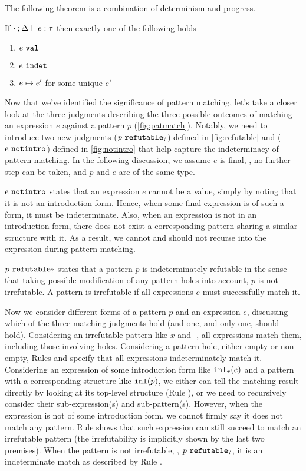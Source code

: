 The following theorem is a combination of determinism and progress.
\begin{theorem}
  \label{theorem:determinism}
  If $\cdot \mathbin{;} \Delta \vdash e : \tau$ then exactly one of the following holds
  \begin{enumerate}
    \item $e ~\mathtt{val}$
    \item $e ~\mathtt{indet}$
    \item $e \mapsto e'$ for some unique $e'$
  \end{enumerate}
\end{theorem}




Now that we've identified the significance of pattern matching, let's take a closer look at the three judgments describing the three possible outcomes of matching an expression $e$ against a pattern $p$ (\autoref{fig:patmatch}). Notably, we need to introduce two new judgments ($p ~\mathtt{refutable}_?$) defined in \autoref{fig:refutable} and ($e ~\mathtt{notintro}$) defined in \autoref{fig:notintro} that help capture the indeterminacy of pattern matching. In the following discussion, we assume $e$ is final, \ie, no further step can be taken, and $p$ and $e$ are of the same type.

$e ~\mathtt{notintro}$ states that an expression $e$ cannot be a value, simply by noting that it is not an introduction form. Hence, when some final expression is of such a form, it must be indeterminate. Also, when an expression is not in an introduction form, there does not exist a corresponding pattern sharing a similar structure with it. As a result, we cannot and should not recurse into the expression during pattern matching.

$p ~\mathtt{refutable}_?$ states that a pattern $p$ is indeterminately refutable in the sense that taking possible modification of any pattern holes into account, $p$ is not irrefutable. A pattern is irrefutable if all expressions $e$ must successfully match it.

Now we consider different forms of a pattern $p$ and an expression $e$, discussing which of the three matching judgments hold (and one, and only one, should hold).
Considering an irrefutable pattern like $x$ and $\_$, all expressions match them, including those involving holes.
Considering a pattern hole, either empty or non-empty, Rules \MMEHole and \MMHole specify that all expressions indeterminately match it.
Considering an expression of some introduction form like $\mathtt{inl}_{\tau}({e})$ and a pattern with a corresponding structure like $\mathtt{inl}(p)$, we either can tell the matching result directly by looking at its top-level structure (Rule \NMConfR), or we need to recursively consider their sub-expression(s) and sub-pattern(s).
However, when the expression is not of some introduction form, we cannot firmly say it does not match any pattern. Rule \MNotIntroPair shows that such expression can still succeed to match an irrefutable pattern (the irrefutability is implicitly shown by the last two premises). When the pattern is not irrefutable, \ie, $p ~\mathtt{refutable}_?$, it is an indeterminate match as described by Rule \MMNotIntro.

